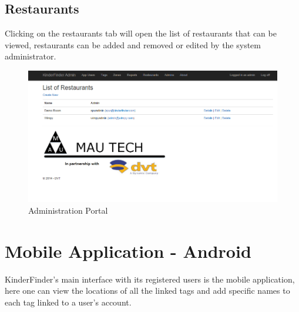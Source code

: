 \documentclass{article}
\begin{document}
\subsection{Restaurants}
Clicking on the restaurants tab will open the list of restaurants that can be viewed, restaurants can be added and removed or edited by the system administrator.
\begin{figure}[H]
\centering
\includegraphics[scale=0.4]{adminportallistofrestaurants.png}
\caption{Administration Portal}
\end{figure}

\newpage
\section{Mobile Application - Android}
KinderFinder's main interface with its registered users is the mobile application, here one can view the locations of all the linked tags and add specific names to each tag linked to  a user's account.
\end{document}
